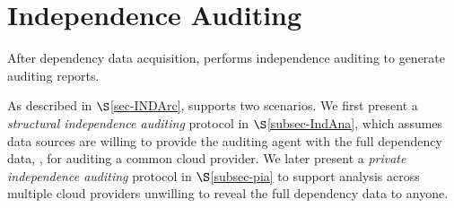 
\chapter{Independence Auditing}
\label{sec-audit}

After dependency data acquisition,
\app performs independence auditing to generate
auditing reports.

As described in $\S$\ref{sec-INDArc}, \app supports
two scenarios.
We first present a
{\em structural independence auditing} protocol in $\S$\ref{subsec-IndAna},
which assumes data sources are willing
to provide the auditing agent with the full dependency data,
\eg, for auditing a common cloud provider.
We later present a
{\em private independence auditing} protocol in $\S$\ref{subsec-pia}
to support analysis across multiple cloud providers
unwilling to reveal the full dependency data to anyone.










